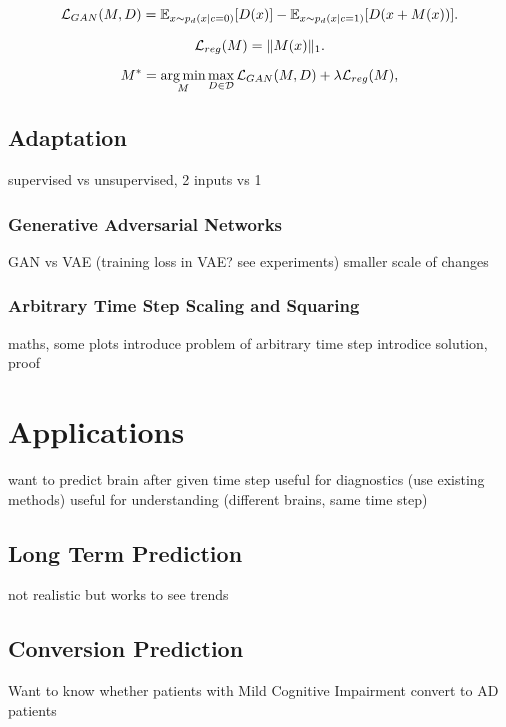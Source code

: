 \begin{equation}
	\mathcal{L}_{GAN}(M, D) = \mathbb{E} _ { x \sim p_d(x | c = 0) } [ D (x) ] 
	 - \mathbb{E} _ { x \sim p_d(x | c = 1) } [ D (x + M(x)) ].
\end{equation}

\begin{equation}
	\mathcal{L}_{reg} (M) = \lVert M(x)\rVert_1.
\end{equation}

\begin{equation}
	M^* = \operatorname*{arg\,min}_M \max_{D \in \mathcal{D}} \mathcal{L}_{GAN}(M, D) + \lambda \mathcal{L}_{reg} (M),
\end{equation}


\section{Adaptation}
supervised vs unsupervised, 2 inputs vs 1

\subsection{Generative Adversarial Networks}
GAN vs VAE (training loss in VAE? see experiments)
smaller scale of changes

\subsection{Arbitrary Time Step Scaling and Squaring}
maths, some plots
introduce problem of arbitrary time step
introdice solution, proof

\chapter{Applications}

want to predict brain after given time step
useful for diagnostics (use existing methods)
useful for understanding (different brains, same time step)

\section{Long Term Prediction}
not realistic but works to see trends

\section{Conversion Prediction}
Want to know whether patients with Mild Cognitive Impairment convert to AD patients

